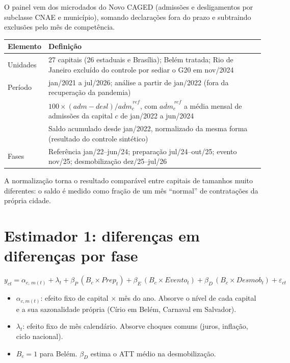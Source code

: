 O painel vem dos microdados do Novo CAGED (admissões e desligamentos por subclasse CNAE e município),
somando declarações fora do prazo e subtraindo exclusões pelo mês de competência.

\begin{table}[H]
\centering\small
\begin{tabularx}{\linewidth}{p{2.6cm}L}
\toprule
\textbf{Elemento} & \textbf{Definição}\\
\midrule
Unidades & 27 capitais (26 estaduais e Brasília); Belém tratada; Rio de Janeiro excluído do controle por sediar o G20 em nov/2024\\
Período & jan/2021 a jul/2026; análise a partir de jan/2022 (fora da recuperação da pandemia)\\
 & $100 \times (adm - desl)/\overline{adm}^{\,ref}_c$, com $\overline{adm}^{\,ref}_c$ a média mensal de admissões da capital $c$ de jan/2022 a jun/2024\\
 & Saldo acumulado desde jan/2022, normalizado da mesma forma (resultado do controle sintético)\\
Fases & Referência jan/22--jun/24; preparação jul/24--out/25; evento nov/25; desmobilização dez/25--jul/26\\
\bottomrule
\end{tabularx}
\end{table}

A normalização torna o resultado comparável entre capitais de tamanhos muito diferentes: o saldo é
medido como fração de um mês ``normal'' de contratações da própria cidade.


\section{Estimador 1: diferenças em diferenças por fase}

\begin{equation}
y_{ct} = \alpha_{c,\,m(t)} + \lambda_t + \beta_P\,(B_c \times Prep_t) + \beta_E\,(B_c \times Evento_t)
       + \beta_D\,(B_c \times Desmob_t) + \varepsilon_{ct}
\end{equation}

\begin{itemize}
  \item $\alpha_{c,m(t)}$: efeito fixo de capital $\times$ mês do ano. Absorve o nível de cada capital e
        a sua sazonalidade própria (Círio em Belém, Carnaval em Salvador).
  \item $\lambda_t$: efeito fixo de mês calendário. Absorve choques comuns (juros, inflação, ciclo nacional).
  \item $B_c = 1$ para Belém. $\beta_D$ estima o ATT médio na desmobilização.
\end{itemize}

